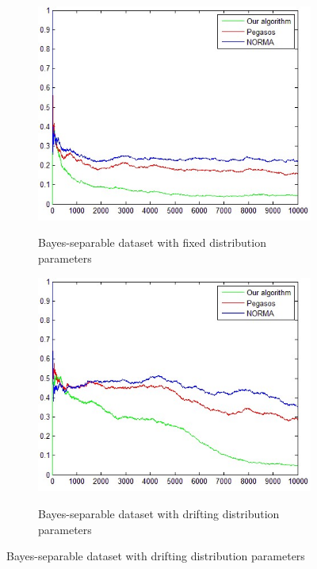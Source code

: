\begin{figure}[t]
 \begin{subfigure}[c]{.45\linewidth}
	   \includegraphics[width=0.9\linewidth]{PN_Bayess_Lin}
           \label{BL}
           \caption{Bayes-separable dataset with fixed distribution parameters}
 \end{subfigure}%
\hspace{.01\linewidth}
\begin{subfigure}[c]{.45\linewidth}
    \includegraphics[width=0.9\linewidth]{PN_Move_Lin}
    \label{ML} 
   \caption{Bayes-separable dataset with drifting distribution parameters}
\end{subfigure}%


\end{figure}
